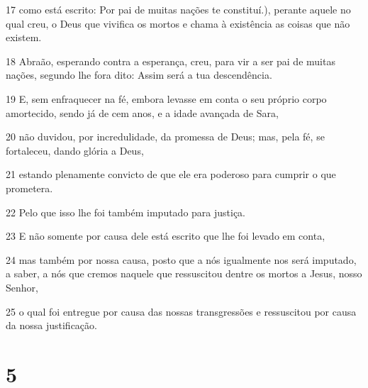 \par 17 como está escrito: Por pai de muitas nações te constituí.), perante aquele no qual creu, o Deus que vivifica os mortos e chama à existência as coisas que não existem.
\par 18 Abraão, esperando contra a esperança, creu, para vir a ser pai de muitas nações, segundo lhe fora dito: Assim será a tua descendência.
\par 19 E, sem enfraquecer na fé, embora levasse em conta o seu próprio corpo amortecido, sendo já de cem anos, e a idade avançada de Sara,
\par 20 não duvidou, por incredulidade, da promessa de Deus; mas, pela fé, se fortaleceu, dando glória a Deus,
\par 21 estando plenamente convicto de que ele era poderoso para cumprir o que prometera.
\par 22 Pelo que isso lhe foi também imputado para justiça.
\par 23 E não somente por causa dele está escrito que lhe foi levado em conta,
\par 24 mas também por nossa causa, posto que a nós igualmente nos será imputado, a saber, a nós que cremos naquele que ressuscitou dentre os mortos a Jesus, nosso Senhor,
\par 25 o qual foi entregue por causa das nossas transgressões e ressuscitou por causa da nossa justificação.

\chapter{5}

